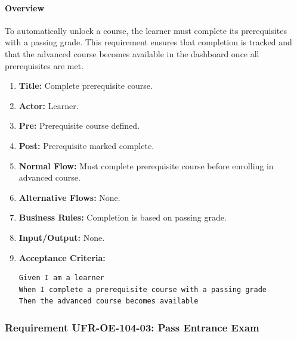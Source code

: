 \paragraph{Overview}
To automatically unlock a course, the learner must complete its prerequisites with a passing grade. This requirement ensures that completion is tracked and that the advanced course becomes available in the dashboard once all prerequisites are met.
\begin{enumerate}[label=\textbf{\arabic*.}]
\item \textbf{Title:} Complete prerequisite course.
\item \textbf{Actor:} Learner.
\item \textbf{Pre:} Prerequisite course defined.
\item \textbf{Post:} Prerequisite marked complete.
\item \textbf{Normal Flow:} Must complete prerequisite course before enrolling in advanced course.
\item \textbf{Alternative Flows:} None.
\item \textbf{Business Rules:} Completion is based on passing grade.
\item \textbf{Input/Output:} None.
\item \textbf{Acceptance Criteria:}
    \begin{verbatim}
Given I am a learner
When I complete a prerequisite course with a passing grade
Then the advanced course becomes available
    \end{verbatim}
\end{enumerate}

\subsubsection{Requirement UFR-OE-104-03: Pass Entrance Exam}
